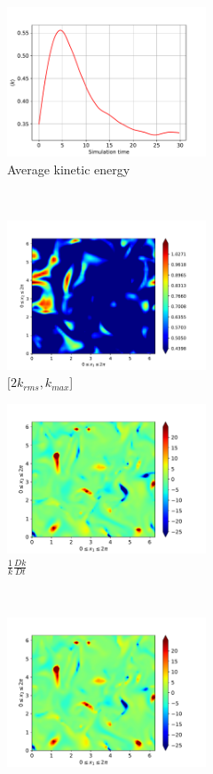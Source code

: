 \begin{figure}[H]
    \begin{subfigure}[H]{0.45\textwidth}
        \includegraphics[height=1.75in]{media/run-cds-65/ke-average1335}
        \caption{Average kinetic energy}
    \end{subfigure}
    ~
    \begin{subfigure}[H]{0.45\textwidth}
        \includegraphics[height=1.75in]{media/run-cds-65/ke-2-1335}
        \caption{$[2k_{rms}, k_{max} $] }
    \end{subfigure}
    \newline
    \begin{subfigure}[H]{0.45\textwidth}
        \includegraphics[height=1.75in]{media/run-cds-65/ke-1335}
        \caption{$\frac{1}{k} \frac{D k}{Dt}$}
    \end{subfigure}
    ~
    \begin{subfigure}{0.45\textwidth}
        \includegraphics[height=1.75in]{media/run-cds-65/A-ke-1335}

\end{subfigure}
\end{figure}
